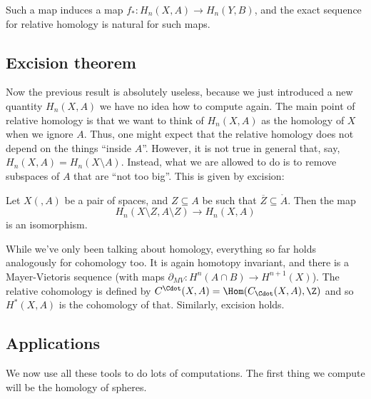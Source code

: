 \documentclass[a4paper]{article}
\theoremstyle{definition}
\begin{document}
Such a map induces a map $f_*: H_n(X, A) \to H_n(Y, B)$, and the exact sequence for relative homology is natural for such maps.

\subsection{Excision theorem}
Now the previous result is absolutely useless, because we just introduced a new quantity $H_n(X, A)$ we have no idea how to compute again. The main point of relative homology is that we want to think of $H_n(X, A)$ as the homology of $X$ when we ignore $A$. Thus, one might expect that the relative homology does not depend on the things ``inside $A$''. However, it is not true in general that, say, $H_n(X, A) = H_n(X \setminus A)$. Instead, what we are allowed to do is to remove subspaces of $A$ that are ``not too big''. This is given by excision:

\begin{thm}
  Let $X(, A)$ be a pair of spaces, and $Z \subseteq A$ be such that $\overline{Z} \subseteq \mathring{A}$. Then the map
  \[
    H_n(X \setminus Z, A \setminus Z) \to H_n(X, A)
  \]
  is an isomorphism.
\end{thm}
\begin{center}
\end{center}
While we've only been talking about homology, everything so far holds analogously for cohomology too. It is again homotopy invariant, and there is a Mayer-Vietoris sequence (with maps $\partial_{MV}: H^n(A \cap B) \to H^{n + 1}(X)$). The relative cohomology is defined by $C^{\Cdot}(X, A) = \Hom(C_{\Cdot}(X, A), \Z)$ and so $H^*(X, A)$ is the cohomology of that. Similarly, excision holds.

\subsection{Applications}
We now use all these tools to do lots of computations. The first thing we compute will be the homology of spheres.
\end{document}
